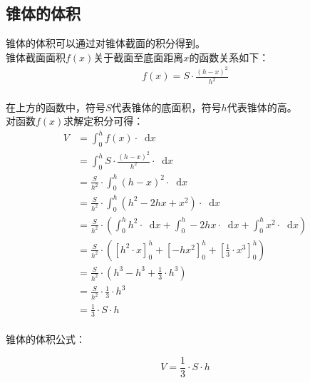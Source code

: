 \documentclass[UTF8]{ctexart}
\newcommand*{\dif}{\mathop{}\!\mathrm{d}}
\begin{document}
\subsection{锥体的体积}
    锥体的体积可以通过对锥体截面的积分得到。\\[3mm]
    锥体截面面积$f(x)$关于截面至底面距离$x$的函数关系如下：
    \setcounter{equation}{0}
    \begin{align}
        f(x)=S\cdot\frac{(h-x)^2}{h^2}
    \end{align}\\
    在上方的函数中，符号$S$代表锥体的底面积，符号$h$代表锥体的高。\\[8mm]
    对函数$f(x)$求解定积分可得：\vspace{3pt}
    \begin{align}
        V
        &=\int_0^h f(x)\cdot\dif x\\[4mm]
        &=\int_0^h S\cdot\frac{(h-x)^2}{h^2}\cdot\dif x\\[4mm]
        &=\frac{S}{h^2}\cdot\int_0^h (h-x)^2\cdot\dif x\\[4mm]
        &=\frac{S}{h^2}\cdot\int_0^h \left(h^2-2hx+x^2\right)\cdot\dif x\\[4mm]
        &=\frac{S}{h^2}\cdot\left(\int_0^h h^2\cdot\dif x+\int_0^h -2hx\cdot\dif x+\int_0^h x^2\cdot\dif x\right)\\[4mm]
        &=\frac{S}{h^2}\cdot\left([h^2\cdot x]_0^h+[-hx^2]_0^h+\left[\frac{1}{3}\cdot x^3\right]_0^h\right)\\[4mm]
        &=\frac{S}{h^2}\cdot\left(h^3-h^3+\frac{1}{3}\cdot h^3\right)\\[4mm]
        &=\frac{S}{h^2}\cdot\frac{1}{3}\cdot h^3\\[4mm]
        &=\frac{1}{3}\cdot S\cdot h
    \end{align}\\
    锥体的体积公式：
    \begin{large}
        \begin{equation*}
            V=\frac{1}{3}\cdot S\cdot h
        \end{equation*}
    \end{large}

\newpage
\end{document}
